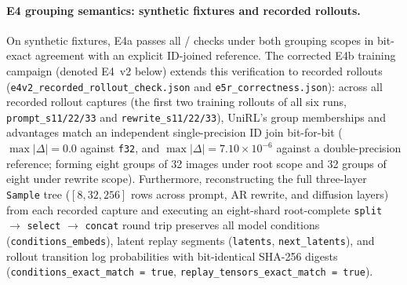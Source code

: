 \documentclass[10pt]{article}
\newcommand{\sample}{\texttt{Sample}}
\newcommand{\codepath}[1]{\texttt{#1}}
\begin{document}
\paragraph{E4 grouping semantics: synthetic fixtures and recorded rollouts.}
On synthetic fixtures, E4a passes all \EFourChecks/\EFourChecks{} checks under both grouping scopes in bit-exact agreement with an explicit ID-joined reference.
The corrected E4b training campaign (denoted E4~v2 below) extends this verification to recorded rollouts (\codepath{e4v2\_recorded\_rollout\_check.json} and \codepath{e5r\_correctness.json}): across all \EFiveRRecordedRollouts{} recorded rollout captures (the first two training rollouts of all six runs, \texttt{prompt\_s11/22/33} and \texttt{rewrite\_s11/22/33}), UniRL's group memberships and advantages match an independent single-precision ID join bit-for-bit ($\max|\Delta| = 0.0$ against \texttt{f32}, and $\max|\Delta| = 7.10\times10^{-6}$ against a double-precision reference; forming eight groups of 32 images under root scope and 32 groups of eight under rewrite scope).
Furthermore, reconstructing the full three-layer \sample{} tree ($[8, 32, 256]$ rows across prompt, AR rewrite, and diffusion layers) from each recorded capture and executing an eight-shard root-complete \texttt{split} $\to$ \texttt{select} $\to$ \texttt{concat} round trip preserves all model conditions (\texttt{conditions\_embeds}), latent replay segments (\texttt{latents}, \texttt{next\_latents}), and rollout transition log probabilities with bit-identical SHA-256 digests (\texttt{conditions\_exact\_match = true}, \texttt{replay\_tensors\_exact\_match = true}).

\begin{table}[H]
\caption{E4~v2 on held-out root prompts: root-conditioned HPSv3 at checkpoint 300 under each grouping scope, one column per training seed. The last row is the registered contrast, root scope minus rewrite scope within each training-seed pair, with a 95\% $t$ interval over the three pairs.}
\label{tab:e4-grouping}
\centering
\small

\end{table}
\end{document}
